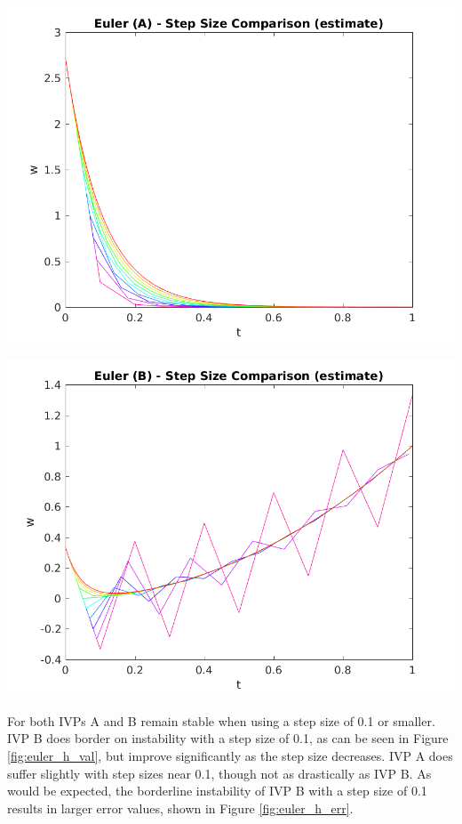 \documentclass{article}
\begin{document}
\begin{center}
	\centering
    \begin{minipage}{0.5\textwidth}
        \centering
	    \includegraphics[width=1\textwidth]{../output/a_euler_h_val.png}
    \end{minipage}\hfill
    \begin{minipage}{0.5\textwidth}
        \centering
	    \includegraphics[width=1\textwidth]{../output/b_euler_h_val.png}
    \end{minipage}
 	\label{fig:euler_h_val}
\end{center}

For both IVPs A and B remain stable when using a step size of 0.1 or smaller. IVP B does border on instability with a step size of 0.1, as can be seen in Figure \ref{fig:euler_h_val}, but improve significantly as the step size decreases. IVP A does suffer slightly with step sizes near 0.1, though not as drastically as IVP B. As would be expected, the borderline instability of IVP B with a step size of 0.1 results in larger error values, shown in Figure \ref{fig:euler_h_err}.
\end{document}
